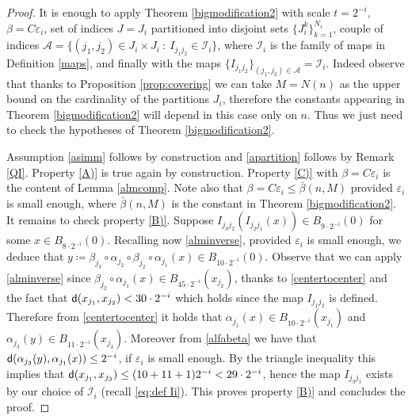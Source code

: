 \documentclass[11pt]{article}
\newcommand{\eps}{\varepsilon}
\newcommand{\sfd}{{\sf d}}
\theoremstyle{plain}
\theoremstyle{definition}
\numberwithin{equation}{section}
\begin{document}
\begin{proof}
	It is enough to apply Theorem \ref{bigmodification2} with scale $t=2^{-i}$, $\beta=C \eps_i$, set of indices $J= J_i$ partitioned into disjoint sets $\{J_i^k\}_{k=1}^{N_i}$, couple of indices  $\mathcal{A}=\{(j_1,j_2) \in J_i\times J_i \ : \ I_{j_1j_2} \in \mathcal I_i\}$, where $\mathcal I_i$ is the family of maps in Definition \ref{maps}, and finally with the maps $\{I_{j_1j_2}\}_{(j_1,j_2)\in \mathcal A}=\mathcal I_i$. Indeed observe that thanks to Proposition \ref{prop:covering} we can take  $M=N(n)$ as the upper bound on the cardinality  of  the partitions $J_i$, therefore the constants appearing in Theorem \ref{bigmodification2} will depend in this case only on $n$. Thus  we just need to check the hypotheses of Theorem \ref{bigmodification2}.
	
	Assumption \eqref{asimm} follows by construction and \eqref{apartition} follows by Remark \ref{QI}. Property \ref{A)} is true again by construction. Property \ref{C)} with $\beta=C \eps_i$ is  the content of Lemma \ref{almcomp}.  Note also that $\beta=C \eps_i\le \bar \beta(n,M)$ provided $\eps_i$ is small enough, where $\bar \beta(n,M)$ is the constant in  Theorem \ref{bigmodification2}. It remains to check property \ref{B)}. Suppose  $I_{j_3j_2}( I_{j_2j_1}(x))\in B_{9\cdot 2^{-i}}(0)$ for some $x \in B_{8\cdot 2^{-i}}(0)$. Recalling now \eqref{alminverse}, provided $\eps_i$ is small enough, we deduce that $y\coloneqq \beta_{j_3}\circ \alpha_{j_2}\circ \beta_{j_2}\circ \alpha_{j_1}(x) \in B_{10\cdot 2^{-i}}(0)$. Observe that we can apply \eqref{alminverse} since $\beta_{j_2}\circ \alpha_{j_1}(x) \in B_{45\cdot 2^{-i}}(x_{j_2})$, thanks to \eqref{centertocenter} and the fact that $\sfd(x_{j_1},x_{j_2})<30\cdot 2^{-i}$ which holds since the map $I_{j_1j_2}$ is defined.
	Therefore from \eqref{centertocenter} it holds that $\alpha_{j_1}(x)\in B_{10\cdot 2^{-i}}(x_{j_1})$ and $\alpha_{j_3}(y)\in B_{11\cdot 2^{-i}}(x_{j_3})$. Moreover from \eqref{alfabeta} we have that $\sfd(\alpha_{j_3}(y),\alpha_{j_1}(x))\le 2^{-i} $, if $\eps_i$ is small enough. By the triangle inequality this implies that $\sfd(x_{j_1},x_{j_3})\le (10+11+1)2^{-i}<29\cdot 2^{-i}$, hence the map $I_{j_3j_1}$ exists by our choice of $\mathcal I_i$ (recall \eqref{eq:def Ii}). This proves property \ref{B)} and concludes the proof.
\end{proof}	
\end{document}
